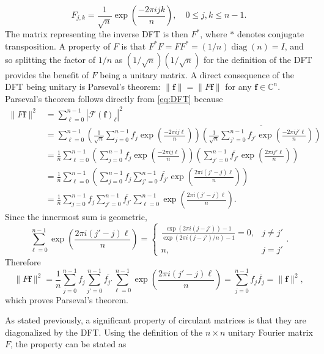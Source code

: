 \documentclass[12pt,notitlepage]{report}
\newcommand{\ctrans}{*}	%
\DeclareMathOperator{\diag}{diag}	%
\begin{document}
\begin{equation}
F_{j,k} = \frac{1}{\sqrt{n}}\exp\left(\frac{-2\pi{ijk}}{n}\right), \quad 0 \leq j,k \leq n-1.
\label{eq:DFT-Matrix}
\end{equation}
The matrix representing the inverse DFT is then $F^\ctrans$, where $\ctrans$ denotes conjugate transposition. A property of $F$ is that $F^\ctrans F = FF^\ctrans = (1/n)\diag(n) = I$, and so splitting the factor of $1/n$ as $(1/\sqrt{n})(1/\sqrt{n})$ for the definition of the DFT provides the benefit of $F$ being a unitary matrix. A direct consequence of the DFT being unitary is Parseval's theorem: $\|\mathbf{f}\| = \|F\mathbf{f}\|$ for any $\mathbf{f} \in \mathbb{C}^n$. Parseval's theorem follows directly from \eqref{eq:DFT} because
\begin{align*}
\|F\mathbf{f}\|^2 &= \sum_{\ell=0}^{n-1} |\mathcal{F}(\mathbf{f})_\ell |^2 \\
&= \sum_{\ell=0}^{n-1} \left(\frac{1}{\sqrt{n}}\sum_{j=0}^{n-1} f_{j}\exp\left(\frac{-2\pi{ij\ell}}{n}\right)\right)\overline{\left(\frac{1}{\sqrt{n}}\sum_{j'=0}^{n-1} f_{j'}\exp\left(\frac{-2\pi{ij'\ell}}{n}\right)\right)} \\
&= \frac{1}{n} \sum_{\ell=0}^{n-1} \left(\sum_{j=0}^{n-1} f_{j}\exp\left(\frac{-2\pi{ij\ell}}{n}\right)\right) \left(\sum_{j'=0}^{n-1} \overline{f_{j'}}\exp\left(\frac{2\pi{ij'\ell}}{n}\right)\right) \\
&= \frac{1}{n} \sum_{\ell=0}^{n-1} \left(\sum_{j=0}^{n-1} f_{j} \sum_{j'=0}^{n-1} \overline{f_{j'}} \exp\left(\frac{2\pi{i(j'-j)\ell}}{n}\right)\right) \\
&= \frac{1}{n} \sum_{j=0}^{n-1} f_j \sum_{j'=0}^{n-1} \overline{f_{j'}} \sum_{\ell=0}^{n-1} \exp\left(\frac{2\pi{i(j'-j)\ell}}{n}\right).
\end{align*}
Since the innermost sum is geometric,
\[\sum_{\ell=0}^{n-1} \exp\left(\frac{2\pi{i(j'-j)\ell}}{n}\right) = \begin{cases}
\frac{\exp(2\pi{i}(j-j')) - 1}{\exp(2\pi{i}(j-j')/n) - 1} = 0, & j \neq j' \\
n, & j = j'
\end{cases}.\]
Therefore
\[\|F\mathbf{f}\|^2 = \frac{1}{n} \sum_{j=0}^{n-1} f_j \sum_{j'=0}^{n-1} \overline{f_{j'}} \sum_{\ell=0}^{n-1} \exp\left(\frac{2\pi{i(j'-j)\ell}}{n}\right) = \sum_{j=0}^{n-1} f_j\overline{f_j} = \|\mathbf{f}\|^2,\]
which proves Parseval's theorem. \par
As stated previously, a significant property of circulant matrices is that they are diagonalized by the DFT. Using the definition of the $n \times n$ unitary Fourier matrix $F$, the property can be stated as
\end{document}
